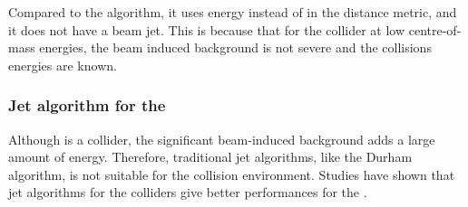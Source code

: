 Compared to the \kt algorithm, it uses energy instead of \pT in the distance metric, and it does not have a beam jet. This is because that for the \ee collider at low centre-of-mass energies, the beam induced background is not severe and the collisions energies are known.

\subsubsection{Jet algorithm for the \CLIC}

Although \CLIC is a \ee collider, the significant beam-induced background adds a large amount of energy. Therefore, traditional \ee jet algorithms, like the Durham algorithm, is not suitable for the \CLIC collision environment. Studies have shown that jet algorithms for the \pp colliders give better performances for the \CLIC \cite{Linssen:2012hp,LCD-Note-2010-006}.





